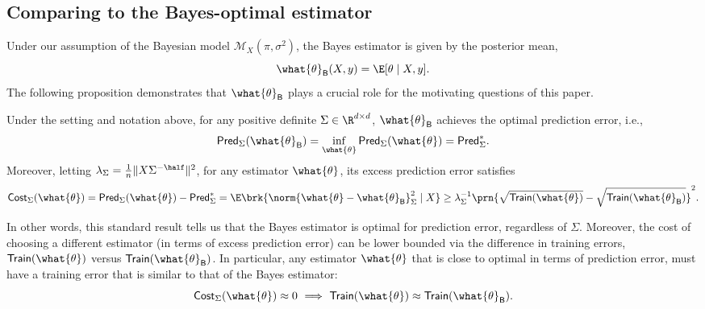 \documentclass[11pt]{article}
\newcommand{\bysest}{\what{\theta}_{\mathsf{B}}}
\newcommand{\trerr}{\mathsf{Train}}
\newcommand{\prerr}{\mathsf{Pred}}
\newcommand{\cost}{\mathsf{Cost}}
\newcommand{\model}{\mathscr{M}}
\begin{document}
%     




\subsection{Comparing to the Bayes-optimal estimator}
Under our assumption of the Bayesian model $\model_X(\pi,\sigma^2)$, the Bayes estimator is given by the posterior mean,
\[\bysest(X,y) = \E [\theta \mid X, y].\]
The following proposition demonstrates that $\bysest$ plays a crucial role for the motivating questions of this paper.
\begin{proposition}\label{prop:compare_to_Bayes}
    Under the setting and notation above, for any positive definite $\Sigma\in\R^{d\times d}$, $\bysest$ achieves the optimal prediction error, i.e.,
\[\prerr_\Sigma(\bysest) = \inf_{\what{\theta}}\prerr_\Sigma(\what{\theta}) = \prerr_\Sigma^*.\]
Moreover, letting $\lambda_\Sigma = \frac{1}{n}\|X \Sigma^{-\half}\|^2$, for any estimator $\what{\theta}$, its excess prediction error satisfies
\[\cost_\Sigma(\what{\theta}) = \prerr_\Sigma(\what{\theta}) - \prerr_\Sigma^* = \E \brk{\norm{\what{\theta} - \bysest}_{\Sigma}^2\mid X} \geq \lambda_\Sigma^{-1}\prn{\sqrt{\trerr(\what{\theta})} - \sqrt{\trerr(\bysest)}}^2.\]
\end{proposition}
In other words, this standard result tells us that the Bayes estimator is optimal for prediction error, regardless of $\Sigma$. Moreover, the cost of choosing a different estimator (in terms of excess prediction error) can be lower bounded via the difference in training errors, $\trerr(\what{\theta})$ versus $\trerr(\bysest)$. In particular, any estimator $\what{\theta}$ that is close to optimal in terms of prediction error, must have a training error that is similar to that of the Bayes estimator:
\[\cost_\Sigma(\what{\theta}) \approx 0 \ \Longrightarrow \ \trerr(\what{\theta})\approx \trerr(\bysest).\]
\end{document}
